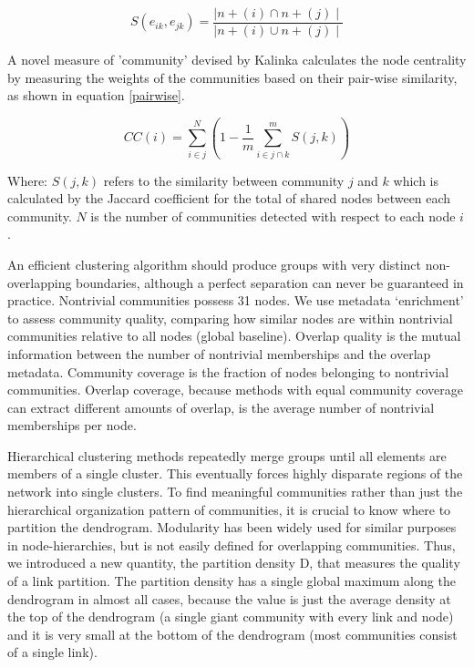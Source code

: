 \documentclass[a4paper,8pt,twocolumn,5p]{elsarticle}
\begin{document}
\begin{equation}\label{jaccard}
     S(e_{ik}, e_{jk}) =  \frac{\mid n + (i) \cap n + (j) \mid}{\mid n + (i) \cup n + (j) \mid}
\end{equation}

A novel measure of 'community' devised by Kalinka calculates the node centrality by measuring the weights of the communities based on their pair-wise similarity, as shown in equation \ref{pairwise}. 

\begin{equation}\label{pairwise}
     CC(i) =   \sum_{i\in j}^{N} \left( 1 -  \frac{1}{m} \sum_{i\in j \cap k}^{m} S(j,k) \right)
\end{equation}

Where: $S(j,k)$ refers to the similarity between community $j$ and $k$ which is calculated by the Jaccard coefficient for the total of shared nodes between each community. $N$ is the number of communities detected with respect to each node $i$.

An efficient clustering algorithm should produce groups with very distinct non-overlapping boundaries, although a perfect separation can never be guaranteed in practice. Nontrivial communities possess 31 nodes. We use metadata ‘enrichment’ to assess community quality, comparing how similar nodes are within nontrivial communities relative to all nodes (global baseline). Overlap quality is the mutual information between the number of nontrivial memberships and the overlap metadata. Community coverage is the fraction of nodes belonging to  nontrivial communities. Overlap coverage, because methods with equal community coverage can extract different amounts of overlap, is the average number of nontrivial memberships per node. 

Hierarchical clustering methods repeatedly merge groups until all elements are members of a single cluster. This eventually forces highly disparate regions of the network into single clusters. To find meaningful communities rather than just the hierarchical organization pattern of communities, it is crucial to know where to partition the dendrogram. Modularity has been widely used for similar purposes in node-hierarchies, but is not easily defined for overlapping communities. Thus, we introduced a new quantity, the partition density D, that measures the quality of a link partition. The partition density has a single global maximum along the dendrogram in almost all cases, because the value is just the average density at the top of the dendrogram (a single giant community with every link and node) and it is very small at the bottom of the dendrogram (most communities consist of a single link).
\end{document}
